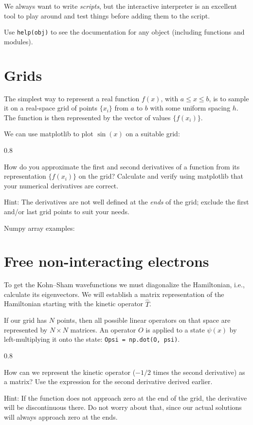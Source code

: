 \documentclass{article}
\newcommand{\exercise}[1]{
  \bigskip
  \begin{boxedminipage}[c]{0.8\linewidth}
  #1
  \end{boxedminipage}
  \bigskip
}
\begin{document}
We always want to write \emph{scripts},
but the interactive interpreter is an excellent tool to play around and test
things before adding them to the script.

Use \lstinline{help(obj)} to see the documentation for any object
(including functions and modules).

\section{Grids}
The simplest way to represent a real function $f(x)$,
with $a \le x \le b$, is to
sample it on a real-space grid of points $\{x_i\}$ from $a$ to $b$ with some
uniform spacing $h$.
The function is then represented by the vector of values $\{f(x_i)\}$.

\noindent We can use matplotlib to plot $\sin(x)$ on a suitable grid:



\exercise{
How do you approximate the first and second derivatives of a function from
its representation $\{f(x_i)\}$ on the grid?  Calculate and verify using matplotlib that your
numerical derivatives are correct.
}

Hint: The derivatives are not well defined at the \emph{ends} of the grid;
exclude the first and/or last grid points to suit your needs.

\noindent Numpy array examples:


\section{Free non-interacting electrons}

To get the Kohn--Sham wavefunctions we must diagonalize the
Hamiltonian, i.e., calculate its eigenvectors.  We will establish a matrix
representation of the Hamiltonian starting with the kinetic operator
$\hat T$.

If our grid has $N$ points, then all possible linear operators on that
space are represented by $N\times N$ matrices.  An operator $O$ is
applied to a state $\psi(x)$ by left-multiplying it onto the state:
\texttt{Opsi = np.dot(O, psi)}.

\exercise{
How can we represent the kinetic operator ($-1/2$ times the second derivative)
as a matrix?  Use the expression
for the second derivative derived earlier.
}
Hint: If the function does not approach zero at the end of the grid, the derivative will be discontinuous there.  Do not worry about that, since our actual solutions will always approach zero at the ends.
\end{document}
